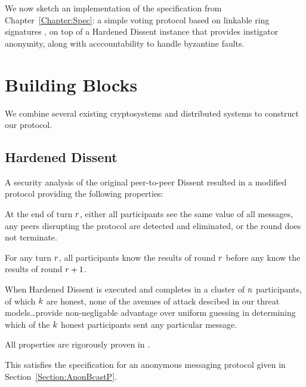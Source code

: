 We now sketch an implementation of the specification from
Chapter~\ref{Chapter:Spec}: a simple voting protocol based on linkable ring
signatures \cite{lrs}, on top of a Hardened Dissent \cite{sec} instance that
provides instigator anonymity, along with acccountability to handle byzantine
faults.
\section{Building Blocks}
We combine several existing cryptosystems and distributed systems to construct
our protocol.
\subsection{Hardened Dissent}
A security analysis of the original peer-to-peer Dissent resulted in a modified
protocol providing the following properties:
  \begin{theorem} At the end of turn $r$, either all participants see the
    same value of all messages, any peers disrupting the protocol are detected
    and eliminated, or the round does not terminate.%
  \end{theorem}
  \begin{theorem} For any turn $r$, all participants know the results of
    round $r$ before any know the results of round
    $r+1$.\end{theorem}\label{theorem:rounds}
  \begin{theorem}[Anonymity] When Hardened Dissent is executed and completes in
    a cluster of $n$ participants, of which $k$ are honest,
    none of the avenues of attack descibed in our threat models\ldots provide
    non-negligable advantage over uniform guessing in determining which of the
    $k$ honest participants sent any particular message.
  \end{theorem}\label{theorem:anon}
  All properties are rigorously proven in \cite{sec}.

This satisfies the specification for an anonymous messaging protocol given in
Section~\ref{Section:AnonBcastP}.


